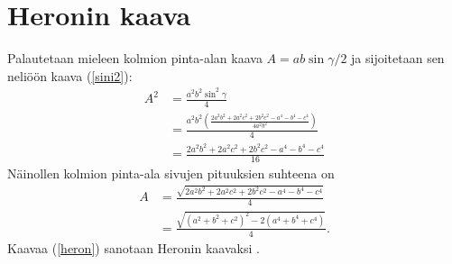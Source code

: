 \documentclass[a4paper,12pt]{amsart}
\begin{document}
\section{Heronin kaava}
Palautetaan mieleen kolmion pinta-alan kaava $A=ab\sin\gamma/2$ ja sijoitetaan sen neliöön kaava (\ref{sini2}):
\begin{equation}
\begin{split}
A^2&= \frac{a^2 b^2\sin^2\gamma}{4} \\
&= \frac{a^2 b^2\left(\frac{2a^2 b^2+2a^2 c^2+2b^2 c^2-a^4-b^4-c^4}{4a^2 b^2}\right)}{4} \\
&= \frac{2a^2 b^2+2a^2 c^2+2b^2 c^2-a^4-b^4-c^4}{16}
\end{split}
\end{equation}
Näinollen kolmion pinta-ala sivujen pituuksien suhteena on
\begin{equation}\label{heron}
\begin{split}
A&= \frac{\sqrt{2a^2 b^2+2a^2 c^2+2b^2 c^2-a^4-b^4-c^4}}{4} \\
&= \frac{\sqrt{(a^2+b^2+c^2)^2-2(a^4+b^4+c^4)}}{4}.
\end{split}
\end{equation}
Kaavaa (\ref{heron}) sanotaan Heronin kaavaksi \cite{heron}.
\end{document}
